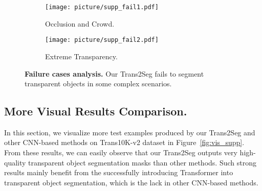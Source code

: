 \documentclass{article}
\begin{document}
\begin{figure*}[t]
    
    \centering
    \begin{subfigure}{0.4\textwidth}
    \texttt{[image: picture/supp\_fail1.pdf]}
    \small
    \caption{Occlusion and Crowd.}
    \label{fig:fail1}
    \end{subfigure}
    \hspace{30pt}
    \begin{subfigure}{0.4\textwidth}
     \texttt{[image: picture/supp\_fail2.pdf]}
     \small
     \caption{Extreme Transparency.}
    \label{fig:fail2}
    \end{subfigure}
    \small
    \caption{\textbf{Failure cases analysis.} Our Trans2Seg fails to segment transparent objects in some complex scenarios.}
    \label{fig:fail}
\end{figure*}

\subsection{More Visual Results Comparison.}
In this section, we visualize more test examples produced by our Trans2Seg and other CNN-based methods on Trans10K-v2 dataset in Figure~\ref{fig:vis_supp}. 
From these results, we can easily observe that our Trans2Seg outputs very high-quality transparent object segmentation masks than other methods. 
Such strong results mainly benefit from the successfully introducing Transformer into transparent object segmentation, which is the lack in other CNN-based methods.
\end{document}
